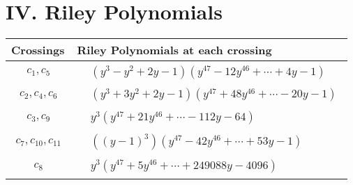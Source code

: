 \documentclass[1p]{elsarticle_modified}
\theoremstyle{definition}
\begin{document}
\centering \section*{ IV. Riley Polynomials}
\begin{tabular}{m{50pt}|m{274pt}}
Crossings & \hspace{64pt}Riley Polynomials at each crossing \\
\hline $$\begin{aligned}c_{1},c_{5}\end{aligned}$$&$\begin{aligned}
&(y^3- y^2+2 y-1)(y^{47}-12 y^{46}+\cdots+4 y-1)
\end{aligned}$\\
\hline $$\begin{aligned}c_{2},c_{4},c_{6}\end{aligned}$$&$\begin{aligned}
&(y^3+3 y^2+2 y-1)(y^{47}+48 y^{46}+\cdots-20 y-1)
\end{aligned}$\\
\hline $$\begin{aligned}c_{3},c_{9}\end{aligned}$$&$\begin{aligned}
&y^3(y^{47}+21 y^{46}+\cdots-112 y-64)
\end{aligned}$\\
\hline $$\begin{aligned}c_{7},c_{10},c_{11}\end{aligned}$$&$\begin{aligned}
&((y-1)^3)(y^{47}-42 y^{46}+\cdots+53 y-1)
\end{aligned}$\\
\hline $$\begin{aligned}c_{8}\end{aligned}$$&$\begin{aligned}
&y^3(y^{47}+5 y^{46}+\cdots+249088 y-4096)
\end{aligned}$\\
\hline
\end{tabular}
\vskip 2pc
\end{document}
